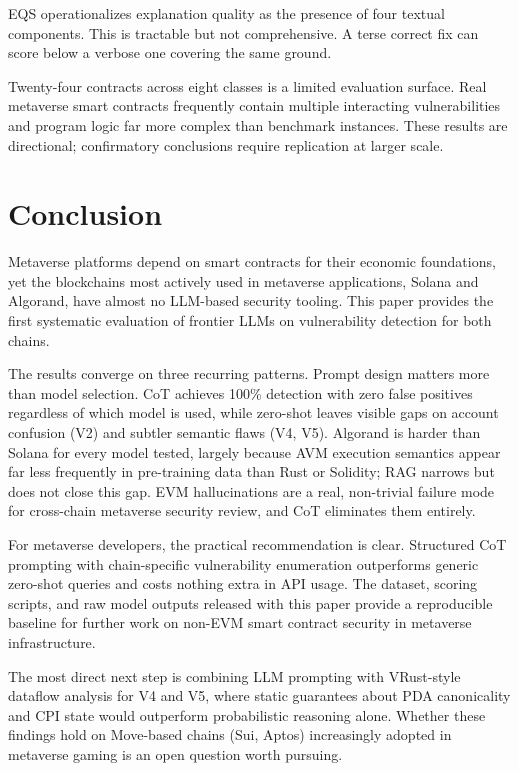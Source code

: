 \documentclass[runningheads]{llncs}
\begin{document}
EQS operationalizes explanation quality as the presence of four textual
components.
This is tractable but not comprehensive. A terse correct fix can score below
a verbose one covering the same ground.

Twenty-four contracts across eight classes is a limited evaluation surface.
Real metaverse smart contracts frequently contain multiple interacting
vulnerabilities and program logic far more complex than benchmark instances.
These results are directional; confirmatory conclusions require replication at
larger scale.

\section{Conclusion}
\label{sec:conclusion}

Metaverse platforms depend on smart contracts for their economic foundations,
yet the blockchains most actively used in metaverse applications, Solana and
Algorand, have almost no LLM-based security tooling.
This paper provides the first systematic evaluation of frontier LLMs on
vulnerability detection for both chains.

The results converge on three recurring patterns.
Prompt design matters more than model selection. CoT achieves 100\% detection
with zero false positives regardless of which model is used, while zero-shot
leaves visible gaps on account confusion (V2) and subtler semantic flaws
(V4, V5).
Algorand is harder than Solana for every model tested, largely because AVM
execution semantics appear far less frequently in pre-training data than Rust
or Solidity; RAG narrows but does not close this gap.
EVM hallucinations are a real, non-trivial failure mode for cross-chain
metaverse security review, and CoT eliminates them entirely.

For metaverse developers, the practical recommendation is clear. Structured CoT
prompting with chain-specific vulnerability enumeration outperforms generic
zero-shot queries and costs nothing extra in API usage.
The dataset, scoring scripts, and raw model outputs released with this paper
provide a reproducible baseline for further work on non-EVM smart contract
security in metaverse infrastructure.

The most direct next step is combining LLM prompting with VRust-style dataflow
analysis for V4 and V5, where static guarantees about PDA canonicality and CPI
state would outperform probabilistic reasoning alone.
Whether these findings hold on Move-based chains (Sui, Aptos) increasingly
adopted in metaverse gaming is an open question worth pursuing.
\end{document}
